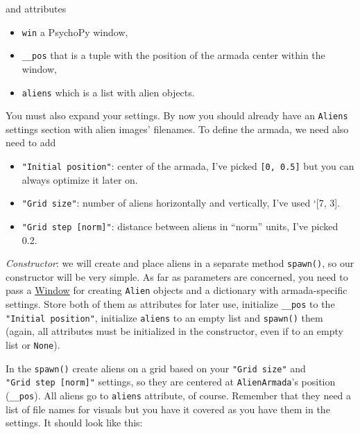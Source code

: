 \documentclass[
]{book}
\providecommand{\tightlist}{%
  \setlength{\itemsep}{0pt}\setlength{\parskip}{0pt}}
\begin{document}
and attributes

\begin{itemize}
\tightlist
\item
  \texttt{win} a PsychoPy window,
\item
  \texttt{\_\_pos} that is a tuple with the position of the armada center within the window,
\item
  \texttt{aliens} which is a list with alien objects.
\end{itemize}

You must also expand your settings. By now you should already have an \texttt{Aliens} settings section with alien images' filenames. To define the armada, we need also need to add

\begin{itemize}
\tightlist
\item
  \texttt{"Initial\ position"}: center of the armada, I've picked \texttt{{[}0,\ 0.5{]}} but you can always optimize it later on.
\item
  \texttt{"Grid\ size"}: number of aliens horizontally and vertically, I've used `{[}7, 3{]}.
\item
  \texttt{"Grid\ step\ {[}norm{]}"}: distance between aliens in ``norm'' units, I've picked 0.2.
\end{itemize}

\emph{Constructor}: we will create and place aliens in a separate method \texttt{spawn()}, so our constructor will be very simple. As far as parameters are concerned, you need to pass a \href{https://psychopy.org/api/visual/index.html}{Window} for creating \texttt{Alien} objects and a dictionary with armada-specific settings. Store both of them as attributes for later use, initialize \texttt{\_\_pos} to the \texttt{"Initial\ position"}, initialize \texttt{aliens} to an empty list and \texttt{spawn()} them (again, all attributes must be initialized in the constructor, even if to an empty list or \texttt{None}).

In the \texttt{spawn()} create aliens on a grid based on your \texttt{"Grid\ size"} and \texttt{"Grid\ step\ {[}norm{]}"} settings, so they are centered at \texttt{AlienArmada}'s position (\texttt{\_\_pos}). All aliens go to \texttt{aliens} attribute, of course. Remember that they need a list of file names for visuals but you have it covered as you have them in the settings. It should look like this:
\end{document}
